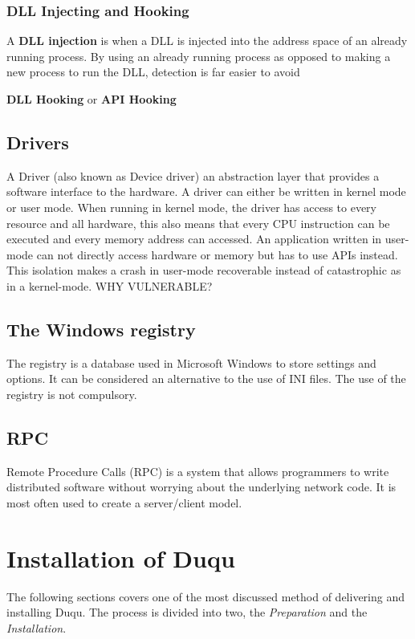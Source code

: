 \documentclass[12pt,english,a4paper]{article}
\begin{document}
\subsubsection{DLL Injecting and Hooking} \label{DLL_HOOKING}
A \textbf{DLL injection} is when a DLL is injected into the address space of an already running process. By using an already running process as opposed to making a new process to run the DLL, detection is far easier to avoid \cite{DEJAN_HOOK}

\textbf{DLL Hooking} or \textbf{API Hooking}


\subsection{Drivers}
A Driver (also known as Device driver) an abstraction layer that provides a software interface to the hardware. A driver can either be written in kernel mode or user mode. When running in kernel mode, the driver has access to every resource and all hardware, this also means that every CPU instruction can be executed and every memory address can accessed. An application written in user-mode can not directly access hardware or memory but has to use APIs instead. This isolation makes a crash in user-mode recoverable instead of catastrophic as in a kernel-mode. WHY VULNERABLE?

\subsection{The Windows registry}
The registry is a database used in Microsoft Windows to store settings and options. It can be considered an alternative to the use of INI files. The use of the registry is not compulsory.

\subsection{RPC}
Remote Procedure Calls (RPC) is a system that allows programmers to write distributed software without worrying about the underlying network code. It is most often used to create a server/client model. \cite{MSRPC}

\section{Installation of Duqu}
The following sections covers one of the most discussed method of delivering and installing Duqu. The process is divided into two, the \textit{Preparation} and the \textit{Installation}.
\end{document}
